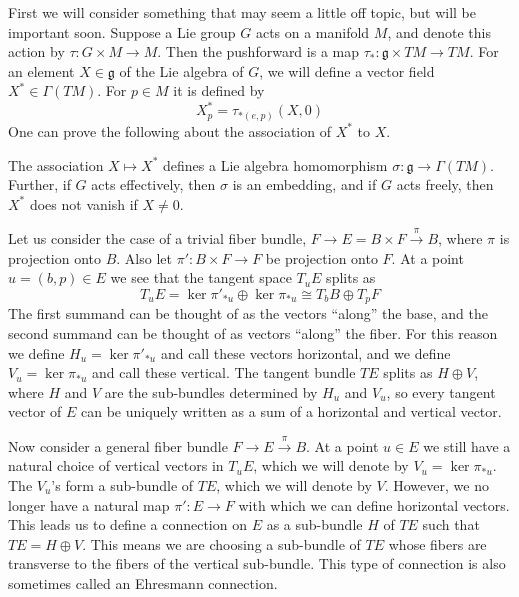 First we will consider something that may seem a little off topic, but will be important soon. Suppose a Lie group $G$ acts on a manifold $M$, and denote this action by $\tau : G \times M \rightarrow M$. Then the pushforward is a map $\tau_* : \mathfrak g \times TM \rightarrow TM$. For an element $X \in \mathfrak g$ of the Lie algebra of $G$, we will define a vector field $X^* \in \Gamma(TM)$. For $p \in M$ it is defined by
\[ X^*_p = \tau_{*(e,p)}(X,0) \]
One can prove the following about the association of $X^*$ to $X$.
\begin{prop}
\label{properties of fundamental vector fields}
The association $X \mapsto X^*$ defines a Lie algebra homomorphism $\sigma : \mathfrak g \rightarrow \Gamma(TM)$. Further, if $G$ acts effectively, then $\sigma$ is an embedding, and if $G$ acts freely, then $X^*$ does not vanish if $X \neq 0$.
\end{prop}

Let us consider the case of a trivial fiber bundle, $F \rightarrow E = B \times F \stackrel{\pi}{\rightarrow} B$, where $\pi$ is projection onto $B$. Also let $\pi' : B \times F \rightarrow F$ be projection onto $F$. At a point $u = (b,p) \in E$ we see that the tangent space $T_u E$ splits as
\[ T_u E = \ker \pi'_{*u} \oplus \ker \pi_{*u} \cong T_b B \oplus T_p F \]
The first summand can be thought of as the vectors ``along'' the base, and the second summand can be thought of as vectors ``along'' the fiber. For this reason we define $H_u = \ker \pi'_{*u}$ and call these vectors horizontal, and we define $V_u = \ker \pi_{*u}$ and call these vertical. The tangent bundle $TE$ splits as $H \oplus V$, where $H$ and $V$ are the sub-bundles determined by $H_u$ and $V_u$, so every tangent vector of $E$ can be uniquely written as a sum of a horizontal and vertical vector.

Now consider a general fiber bundle $F \rightarrow E \stackrel{\pi}{\rightarrow} B$. At a point $u \in E$ we still have a natural choice of vertical vectors in $T_u E$, which we will denote by $V_u = \ker \pi_{*u}$. The $V_u$'s form a sub-bundle of $TE$, which we will denote by $V$. However, we no longer have a natural map $\pi' : E \rightarrow F$ with which we can define horizontal vectors. This leads us to define a connection on $E$ as a sub-bundle $H$ of $TE$ such that $TE = H \oplus V$. This means we are choosing a sub-bundle of $TE$ whose fibers are transverse to the fibers of the vertical sub-bundle. This type of connection is also sometimes called an Ehresmann connection.

